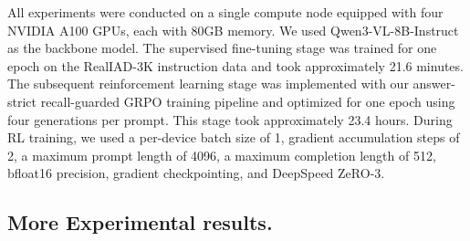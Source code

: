 \documentclass{article}
\begin{document}
{\begin{table}[htbp]
\caption{\textbf{Sensitivity Analysis of Reward Hyperparameters.} We investigate the impact of the scaling factors ($\alpha, \beta, \gamma$) on IndusAgent's performance. Notably, a naïve uniform weighting ($\alpha=\beta=\gamma=1$) slightly degrades performance due to reward distraction. In contrast, our empirically tuned configuration ($\alpha=0.8, \beta=0.6, \gamma=0.5$) achieves the optimal balance between task efficacy and structural compliance.}
\vspace{-2mm}
\centering
{}
\label{tab:reward_ablation}
\end{table}

  All experiments were conducted on a single compute node equipped with four NVIDIA A100 GPUs, each with 80GB memory. We used Qwen3-VL-8B-Instruct as the backbone model. The supervised
  fine-tuning stage was trained for one epoch on the RealIAD-3K instruction data and took approximately 21.6 minutes. The subsequent reinforcement learning stage was implemented with our
  answer-strict recall-guarded GRPO training pipeline and optimized for one epoch using four generations per prompt. This stage took approximately 23.4 hours. During RL training, we
  used a per-device batch size of 1, gradient accumulation steps of 2, a maximum prompt length of 4096, a maximum completion length of 512, bfloat16 precision, gradient checkpointing, and DeepSpeed ZeRO-3.



\subsection{More Experimental results.}

}
\end{document}
